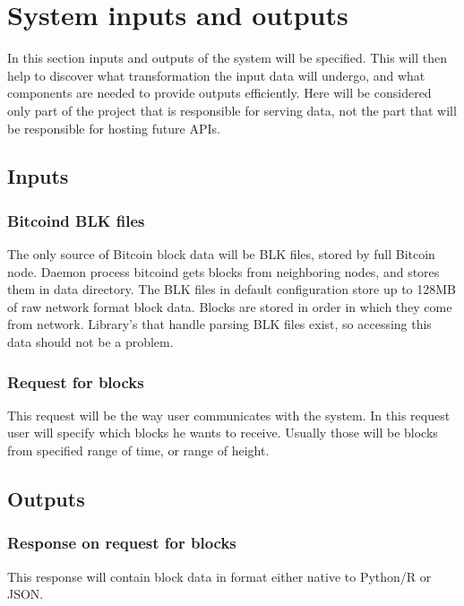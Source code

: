 \documentclass[12pt, en, eng, oneside]{mgr}
\begin{document}
\section{System inputs and outputs}

In this section inputs and outputs of the system will be specified. This will then help to discover what transformation the input data will undergo, and what components are needed to provide outputs efficiently. Here will be considered only part of the project that is responsible for serving data, not the part that will be responsible for hosting future APIs.

\subsection{Inputs}
\subsubsection{Bitcoind BLK files}
The only source of Bitcoin block data will be BLK files, stored by full Bitcoin node. Daemon process bitcoind gets blocks from neighboring nodes, and stores them in data directory. The BLK files in default configuration store up to 128MB of raw network format block data. Blocks are stored in order in which they come from network. Library's that handle parsing BLK files exist, so accessing this data should not be a problem.

\subsubsection{Request for blocks} This request will be the way user communicates with the system. In this request user will specify which blocks he wants to receive. Usually those will be blocks from specified range of time, or range of height.

\subsection{Outputs}
\subsubsection{Response on request for blocks} This response will contain block data in format either native to Python/R or JSON.
\end{document}
